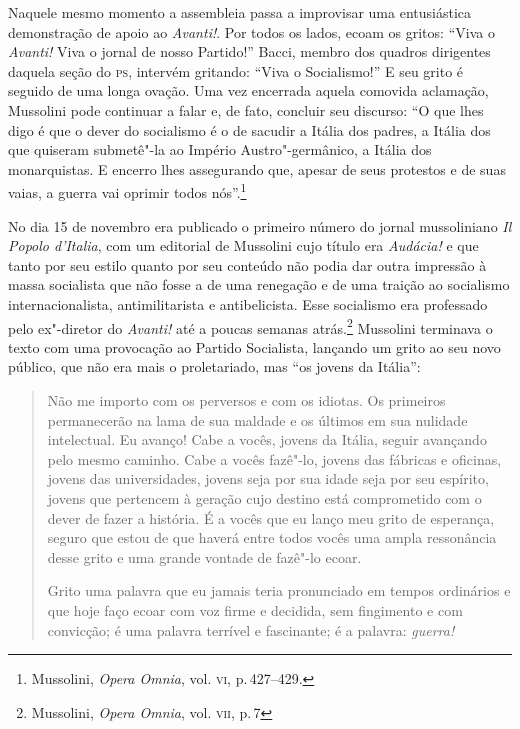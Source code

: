 Naquele mesmo momento a assembleia passa a improvisar uma entusiástica
demonstração de apoio ao \emph{Avanti!}. Por todos os lados, ecoam os
gritos: ``Viva o \emph{Avanti!} Viva o jornal de nosso Partido!'' Bacci,
membro dos quadros dirigentes daquela seção do \textsc{ps}, intervém gritando:
``Viva o Socialismo!'' E seu grito é seguido de uma longa ovação. Uma
vez encerrada aquela comovida aclamação, Mussolini pode continuar a
falar e, de fato, concluir seu discurso: ``O que lhes digo é que o dever
do socialismo é o de sacudir a Itália dos padres, a Itália dos que
quiseram submetê"-la ao Império Austro"-germânico, a Itália dos
monarquistas. E encerro lhes assegurando que, apesar de seus protestos e
de suas vaias, a guerra vai oprimir todos nós''.\footnote{Mussolini,
  \emph{Opera Omnia}, vol. \textsc{vi}, p.\,427--429.}

No dia 15 de novembro era publicado o primeiro número do jornal
mussoliniano \emph{Il Popolo d'Italia}, com um editorial de Mussolini
cujo título era \emph{Audácia!} e que tanto por seu estilo quanto por
seu conteúdo não podia dar outra impressão à massa socialista que não
fosse a de uma renegação e de uma traição ao socialismo
internacionalista, antimilitarista e antibelicista. Esse socialismo era
professado pelo ex"-diretor do \emph{Avanti!} até a poucas semanas
atrás.\footnote{Mussolini, \emph{Opera Omnia}, vol. \textsc{vii}, p.\,7} Mussolini
terminava o texto com uma provocação ao Partido Socialista, lançando um
grito ao seu novo público, que não era mais o proletariado, mas ``os
jovens da Itália'':

\begin{quote}
Não me importo com os perversos e com os idiotas. Os primeiros
permanecerão na lama de sua maldade e os últimos em sua nulidade
intelectual. Eu avanço! Cabe a vocês, jovens da Itália, seguir avançando
pelo mesmo caminho. Cabe a vocês fazê"-lo, jovens das fábricas e
oficinas, jovens das universidades, jovens seja por sua idade seja por
seu espírito, jovens que pertencem à geração cujo destino está
comprometido com o dever de fazer a história. É a vocês que eu lanço meu
grito de esperança, seguro que estou de que haverá entre todos vocês uma
ampla ressonância desse grito e uma grande vontade de fazê"-lo ecoar.

Grito uma palavra que eu jamais teria pronunciado em tempos ordinários e
que hoje faço ecoar com voz firme e decidida, sem fingimento e com
convicção; é uma palavra terrível e fascinante; é a palavra:
\emph{guerra!}
\end{quote}

